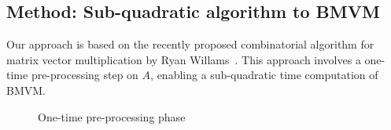 \documentclass[conference, 9pt]{IEEEtran}
\begin{document}
\subsection{Method: Sub-quadratic algorithm to BMVM}
Our approach is based on the recently proposed
combinatorial algorithm for matrix vector multiplication by Ryan Willams~\cite{williams2007matrix}.
This approach involves a one-time pre-processing step on $A$, enabling a sub-quadratic time computation of BMVM.
\begin{figure}[!htpb]
\centering
{}
{}
\caption{One-time pre-processing phase}
\label{fig:pre-process}
\end{figure}
\end{document}
